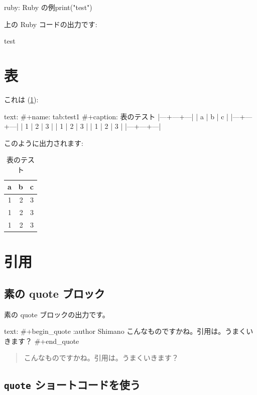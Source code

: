 \documentclass[dvipdfmx,a4j,14pt,uplatex,openany]{jsbook}
\begin{document}
\begin{programlist}[label={nil}]{ruby}{: Ruby の例}print("test")
\end{programlist}

上の Ruby コードの出力です:

\begin{exampleoutput}
test
\end{exampleoutput}


\section{表}
\label{sec:org6b304f1}
これは (\ref{tab:test1}):

\begin{programlist}[label={nil}]{text}{: }#+name: tab:test1
#+caption: 表のテスト
|---+---+---|
| a | b | c |
|---+---+---|
| 1 | 2 | 3 |
| 1 | 2 | 3 |
| 1 | 2 | 3 |
|---+---+---|
\end{programlist}

このように出力されます:

\begin{table}[htbp]
\caption{\label{tab:test1}表のテスト}
\centering
\begin{tabular}{rrr}
\hline
a & b & c\\
\hline
1 & 2 & 3\\
1 & 2 & 3\\
1 & 2 & 3\\
\hline
\end{tabular}
\end{table}

\section{引用}
\label{sec:orgd3ee530}
\subsection{素の quote ブロック}
\label{sec:orgb1fc4bd}
素の quote ブロックの出力です。

\begin{programlist}[label={nil}]{text}{: }#+begin_quote :author Shimano
こんなものですかね。引用は。うまくいきます？
#+end_quote
\end{programlist}

\begin{quote}
こんなものですかね。引用は。うまくいきます？
\end{quote}

\subsection{\texttt{quote} ショートコードを使う}
\label{sec:org496560b}
\end{document}
